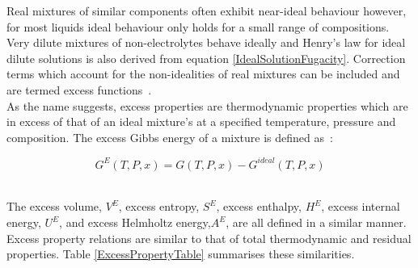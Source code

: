 
Real mixtures of similar components often exhibit near-ideal behaviour however, for most liquids ideal behaviour only holds for a small range of compositions. Very dilute mixtures of non-electrolytes behave ideally and Henry's law for ideal dilute solutions is also derived from equation \ref{IdealSolutionFugacity}. Correction terms which account for the non-idealities of real mixtures can be included and are termed excess functions~\cite{MolecularThermodynamicsOfFluidPhaseEquilibria, SmithNessAbbott}.\\

As the name suggests, excess properties are thermodynamic properties which are in excess of that of an ideal mixture's at a specified temperature, pressure and composition. The excess Gibbs energy of a mixture is defined as~\cite{MolecularThermodynamicsOfFluidPhaseEquilibria, SmithNessAbbott}:\

\begin{equation}
G^{E}\left(T, P, x\right) = G\left(T, P, x\right) - G^{ideal}\left(T, P, x\right)
\end{equation}\


The excess volume, $V^{E}$, excess entropy, $S^{E}$, excess enthalpy, $H^{E}$, excess internal energy, $U^{E}$, and excess Helmholtz energy,$A^{E}$, are all defined in a similar manner. Excess property relations are similar to that of total thermodynamic and residual properties. Table \ref{ExcessPropertyTable} summarises these similarities.\\

